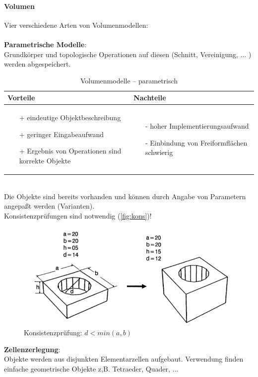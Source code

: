 \paragraph*{Volumen} Vier verschiedene Arten von Volumenmodellen:\\ \\
\textbf{Parametrische Modelle}:\\
Grundkörper und topologische Operationen auf diesen (Schnitt, Vereinigung, ... ) werden abgespeichert. 
\begin{table}[hbt]
\centering
\begin{tabular}{|p{6.5cm}|p{6.5cm}|}
\hline
Vorteile & Nachteile\\
\hline
\vspace{-5mm}
\begin{itemize}
\setlength\itemsep{0em}
\item[+] eindeutige Objektbeschreibung 
\item[+] geringer Eingabeaufwand 
\item[+] Ergebnis von Operationen sind korrekte Objekte
\end{itemize}
 &
 \vspace{-5mm}
\begin{itemize}
\setlength\itemsep{0em}
\item[-] hoher Implementierungsaufwand
\item[-] Einbindung von Freiformflächen schwierig
\end{itemize}\\
\hline
\end{tabular}
\caption{Volumenmodelle -- parametrisch}
\label{tab:Volmod}
\end{table}\\ 
Die Objekte sind bereits vorhanden und können durch Angabe von Parametern angepaßt werden (Varianten).\\
Konsistenzprüfungen sind notwendig (\autoref{fig:kons})! \\
\begin{figure}[h!]
	\centering 
	\includegraphics[width=0.3\linewidth]{figures/ch02_kons.png}
	\caption{Konsistenzprüfung: $d < min(a,b)$}
\label{fig:kons}
\end{figure}
\noindent
\textbf{Zellenzerlegung}:\\
 Objekte werden aus disjunkten Elementarzellen aufgebaut. Verwendung finden einfache geometrische Objekte z,B. Tetraeder, Quader, ...
